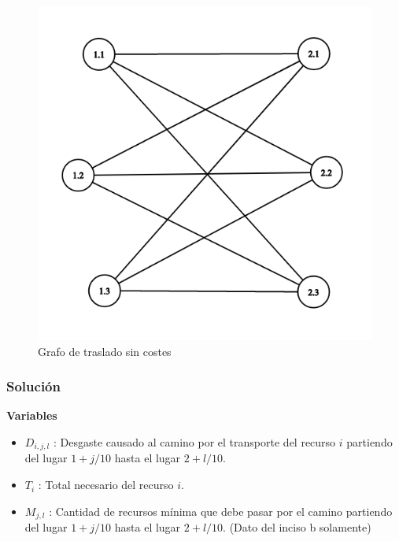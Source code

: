 \documentclass[a4paper,10pt,twocolumn]{article}
\theoremstyle{theorem}
\theoremstyle{definition}
\theoremstyle{remark}
\begin{document}
\begin{figure}[h!]%
	\begin{center}
		\begin{center}
			\includegraphics[scale=.3]{images/graph.png}
		\end{center}
	\caption{Grafo de traslado sin costes}\label{fig:ejer_4_graph}
	\end{center}
\end{figure}


		\subsubsection{Solución}\label{subsubsec:sol_ejer_4}


\textbf{Variables}

\begin{itemize}

\item $D_{i, j, l}$ : Desgaste causado al camino por el transporte del recurso $i$ partiendo del lugar $1 + j/10$ hasta el lugar $2 + l/10$.

\item $T_{i}$ : Total necesario del recurso $i$.

\item $M_{j, l}$ : Cantidad de recursos m\'inima que debe pasar por el camino partiendo del lugar $1+ j/10$ hasta el lugar $2+l/10$. (Dato del inciso b solamente)

\end{itemize}
\end{document}
